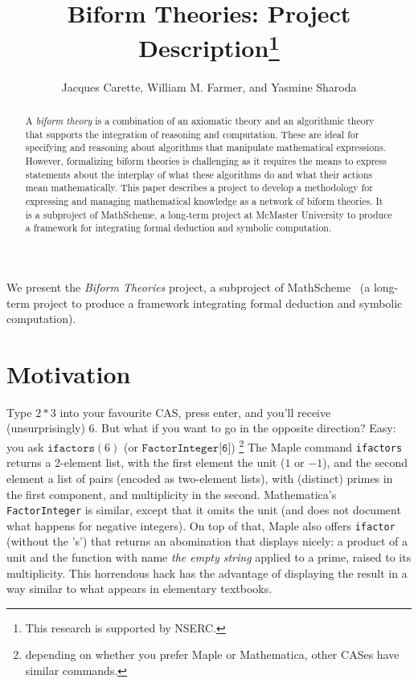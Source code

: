 \documentclass[fleqn]{llncs}
\title{Biform Theories: Project Description\thanks{This research is supported by NSERC.}}
\author{Jacques Carette, William M. Farmer, and Yasmine Sharoda}
\institute{%
Computing and Software, McMaster University, Canada\\
\url{http://www.cas.mcmaster.ca/~carette}\\
\url{http://imps.mcmaster.ca/wmfarmer}\\[1.5ex]
\today
}
\begin{document}
\maketitle

\begin{abstract}
A \emph{biform theory} is a combination of an axiomatic theory and an
algorithmic theory that supports the integration of reasoning and
computation.  These are ideal for specifying and reasoning about
algorithms that manipulate mathematical expressions.  However,
formalizing biform theories is challenging as it requires the means
to express statements about the interplay of what these algorithms do
and what their actions mean mathematically.  This paper describes a
project to develop a methodology for expressing and managing
mathematical knowledge as a network of biform theories.  It is a
subproject of MathScheme, a long-term project at McMaster University
to produce a framework for integrating formal deduction and symbolic
computation.
\end{abstract}

\iffalse 

\textbf{Keywords:} Axiomatic mathematics, algorithmic mathematics, biform
theories, symbolic computation, reasoning about syntax, meaning
formulas, theory graphs.

\fi

\noindent
We present the \emph{Biform Theories} project, a
subproject of MathScheme~\cite{CaretteEtAl11} (a long-term project
to produce a framework integrating formal
deduction and symbolic computation).

\section{Motivation}\label{sec:problem}

Type $2 * 3$ into your favourite CAS, press enter, and you'll receive
(unsurprisingly) $6$. But what if you want to go in the opposite direction?
Easy: you ask $\texttt{ifactors}(6)$ (or $\texttt{FactorInteger[6]}$)%
\footnote{depending on whether you prefer Maple or Mathematica, other
CASes have similar commands.} The Maple command \texttt{ifactors}
returns a 2-element list, with the first element the unit ($1$ or $-1$),
and the second element a list of pairs (encoded as two-element lists),
with (distinct) primes in the first component, and multiplicity in the
second. Mathematica's \texttt{FactorInteger} is similar, except that it
omits the unit (and does not document what happens for negative
integers). On top of that, Maple also offers \texttt{ifactor} (without
the 's') that returns an abomination that displays nicely: a product
of a unit and the function with name \emph{the empty string} applied
to a prime, raised to its multiplicity. This horrendous hack has the
advantage of displaying the result in a way similar to what appears 
in elementary textbooks.
\end{document}
